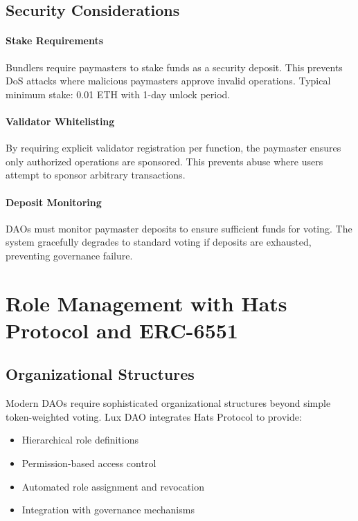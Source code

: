 \documentclass[11pt,a4paper]{article}
\begin{document}
\subsection{Security Considerations}

\paragraph{Stake Requirements} Bundlers require paymasters to stake funds as a security deposit. This prevents DoS attacks where malicious paymasters approve invalid operations. Typical minimum stake: 0.01 ETH with 1-day unlock period.

\paragraph{Validator Whitelisting} By requiring explicit validator registration per function, the paymaster ensures only authorized operations are sponsored. This prevents abuse where users attempt to sponsor arbitrary transactions.

\paragraph{Deposit Monitoring} DAOs must monitor paymaster deposits to ensure sufficient funds for voting. The system gracefully degrades to standard voting if deposits are exhausted, preventing governance failure.

\section{Role Management with Hats Protocol and ERC-6551}

\subsection{Organizational Structures}

Modern DAOs require sophisticated organizational structures beyond simple token-weighted voting. Lux DAO integrates Hats Protocol to provide:

\begin{itemize}
    \item Hierarchical role definitions
    \item Permission-based access control
    \item Automated role assignment and revocation
    \item Integration with governance mechanisms
\end{itemize}
\end{document}
